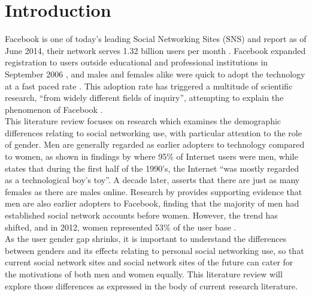\section{Introduction}

Facebook is one of today's leading Social Networking Sites (SNS) and report as of June 2014, their network serves 1.32 billion users per month \citep{Facebook2014}. Facebook expanded registration to users outside educational and professional institutions in September 2006 \citep{Facebook2014}, and males and females alike were quick to adopt the technology at a fast paced rate \citep{Mazman2011}. This adoption rate has triggered a multitude of scientific research, ``from widely different fields of inquiry'', attempting to explain the phenomenon of Facebook \citep[p. 983]{Caers2013}. \\

This literature review focuses on research which examines the demographic differences relating to social networking use, with particular attention to the role of gender. Men are generally regarded as earlier adopters to technology compared to women, as shown in findings by \citet{Pitkow1994} where 95\% of Internet users were men, while \citet[p. 896]{Kimbrough2013} states that during the first half of the 1990's, the Internet ``was mostly regarded as a technological boy's toy''. A decade later, \citet{Fallows2005} asserts that there are just as many females as there are males online. Research by \citet{Fogel2009} provides supporting evidence that men are also earlier adopters to Facebook, finding that the majority of men had established social network accounts before women. However, the trend has shifted, and in 2012, women represented 53\% of the user base \citep{Duggan2013}. \\

As the user gender gap shrinks, it is important to understand the differences between genders and its effects relating to personal social networking use, so that current social network sites and social network sites of the future can cater for the motivations of both men and women equally. This literature review will explore those differences as expressed in the body of current research literature. \\